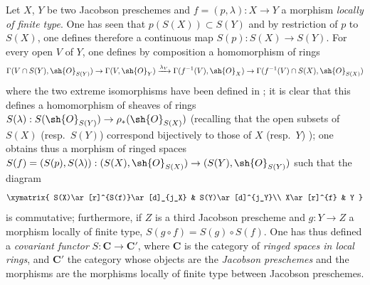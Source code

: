\begin{env}[10.9.2]
\label{IV.10.9.2}
Let $X$, $Y$ be two Jacobson preschemes and $f=(p,\lambda):X\to Y$ a morphism \emph{locally of finite type}.
One has seen  that $p(S(X))\subset S(Y)$ and by restriction of $p$ to $S(X)$, one defines therefore a continuous map $S(p):S(X)\to S(Y)$.
For every open $V$ of $Y$, one defines by composition a homomorphism of rings
\[
  \Gamma(V\cap S(Y),\sh{O}_{S(Y)})\to\Gamma(V,\sh{O}_Y)\xrightarrow{\lambda_V}\Gamma(f^{-1}(V),\sh{O}_X)\to\Gamma(f^{-1}(V)\cap S(X),\sh{O}_{S(X)})
\]
where the two extreme isomorphisms have been defined in ; it is clear that this defines a homomorphism of sheaves of rings $S(\lambda):S(\sh{O}_{S(Y)})\to\rho_*(\sh{O}_{S(X)})$ (recalling that the open subsets of $S(X)$ (resp.\ $S(Y)$) correspond bijectively to those of $X$ (resp.\ $Y$) ); one obtains thus a morphism of ringed spaces $S(f)=(S(p),S(\lambda)):(S(X),\sh{O}_{S(X)})\to(S(Y),\sh{O}_{S(Y)})$ such that the diagram
\[
  \xymatrix{
    S(X)\ar[r]^{S(f)}\ar[d]_{j_X} & S(Y)\ar[d]^{j_Y}\\
    X\ar[r]^{f} & Y
  }
\]
is commutative; furthermore, if $Z$ is a third Jacobson prescheme and $g:Y\to Z$ a morphism locally of finite type, $S(g\circ f)=S(g)\circ S(f)$.
One has thus defined a \emph{covariant functor} $S:\mathbf{C}\to\mathbf{C}'$, where $\mathbf{C}$ is the category of \emph{ringed spaces in local rings}, and $\mathbf{C}'$ the category whose objects are the \emph{Jacobson preschemes} and the morphisms are the morphisms locally of finite type between Jacobson preschemes.
\end{env}

